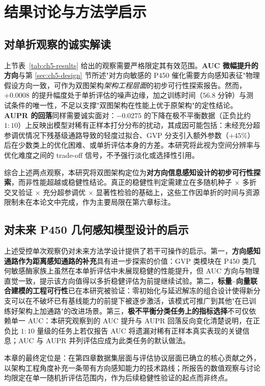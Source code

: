 \section{结果讨论与方法学启示}
\label{sec:ch5-discussion}

\subsection{对单折观察的诚实解读}

上节表~\ref{tab:ch5-results} 给出的观察需要严格限定其有效范围。\textbf{AUC 微幅提升的方向}与第 \ref{sec:ch5-design} 节所述"对方向敏感的 P450 催化需要方向感知表征"物理假设方向一致，可作为双图架构\emph{架构工程层面}的初步可行性探索报告。然而，$+0.0008$ 的提升幅度处于单折评估的噪声边缘，加之训练时间（$56.8$ 分钟）与测试条件的唯一性，不足以支撑"双图架构在性能上优于原架构"的定性结论。\textbf{AUPR 的回落}同样需要诚实面对：$-0.0275$ 的下降在极不平衡数据（正负比约 $1:10$）上反映出模型对稀有正样本打分分布的扰动，其成因可能包括：未经充分超参调优情况下残基级通路导致的轻度过拟合、GVP 分支引入额外参数（$+45\%$）后在少数类上的优化困难、或单折评估本身的方差。本研究将此视为空间分辨率与优化难度之间的 trade-off 信号，不予强行淡化或选择性引用。

综合上述两点观察，本研究将双图架构定位为\textbf{对方向信息感知设计的初步可行性探索}，而非性能超越或稳健性结论。真正的稳健性判定需建立在多随机种子 $\times$ 多折交叉验证 $\times$ 充分超参调优 $\times$ 显著性检验的基础上，这些工作因单折的时间与资源限制未在本论文中完成，作为主要局限在第六章标注。

\subsection{对未来 P450 几何感知模型设计的启示}

上述受控单次观察仍对未来方法学设计提供了若干可操作的启示。第一，\textbf{方向感知通路作为距离感知通路的补充}具有进一步探索的价值：GVP 类模块在 P450 类几何敏感酶家族上虽然在本单折评估中未展现稳健的性能提升，但 AUC 方向与物理直觉一致，提示该方向值得以多折稳健评估为前提继续试验。第二，\textbf{标量--向量联合建模的工程可行性}已在本研究被验证：零初始化与延迟解冻的组合设计使得新分支可以在不破坏已有基线能力的前提下被逐步激活，该模式可推广到其他"在已训练好架构上加通路"的改进场景。第三，\textbf{极不平衡分类任务上的指标选择}不可仅依赖单一 AUC：本研究观察到的 AUC 提升与 AUPR 回落反向变化清楚说明，在正负比 $1:10$ 量级的任务上若仅报告 AUC 将遗漏对稀有正样本真实表现的关键信息；AUC 与 AUPR 并列评估应成为此类任务的默认做法\cite{Saito2015}。

本章的最终定位是：在第四章数据集层面与评估协议层面已确立的核心贡献之外，以架构工程角度补充一条带有方向感知能力的技术路线；所报告的数值观察与讨论均限定在单一随机折评估范围内，作为后续稳健性验证的起点而非终点。
